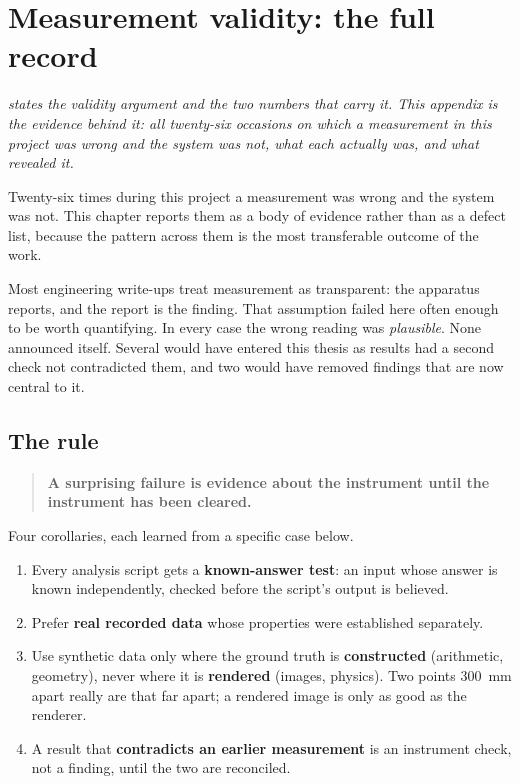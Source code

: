 \chapter{Measurement validity: the full record}
\label{app:instrument}

\noindent\emph{ states the validity argument and the two
numbers that carry it. This appendix is the evidence behind it: all
twenty-six occasions on which a measurement in this project was wrong and the
system was not, what each actually was, and what revealed it.}

\label{ch:instrument}

Twenty-six times during this project a measurement was wrong and the system
was not. This chapter reports them as a body of evidence rather than as a
defect list, because the pattern across them is the most transferable outcome
of the work.

Most engineering write-ups treat measurement as transparent: the apparatus
reports, and the report is the finding. That assumption failed here often
enough to be worth quantifying. In every case the wrong reading was
\emph{plausible}. None announced itself. Several would have entered this
thesis as results had a second check not contradicted them, and two would have
removed findings that are now central to it.

\section{The rule}

\begin{quote}
\textbf{A surprising failure is evidence about the instrument until the
instrument has been cleared.}
\end{quote}

Four corollaries, each learned from a specific case below.

\begin{enumerate}
  \item Every analysis script gets a \textbf{known-answer test}: an input whose
    answer is known independently, checked before the script's output is
    believed.
  \item Prefer \textbf{real recorded data} whose properties were established
    separately.
  \item Use synthetic data only where the ground truth is \textbf{constructed}
    (arithmetic, geometry), never where it is \textbf{rendered} (images,
    physics). Two points \SI{300}{\milli\metre} apart really are that far
    apart; a rendered image is only as good as the renderer.
  \item A result that \textbf{contradicts an earlier measurement} is an
    instrument check, not a finding, until the two are reconciled.
\end{enumerate}

